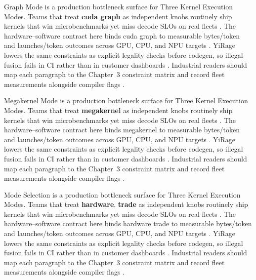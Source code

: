Graph Mode is a production bottleneck surface for Three Kernel Execution Modes. Teams that treat \textbf{cuda graph} as independent knobs routinely ship kernels that win microbenchmarks yet miss decode SLOs on real fleets \citep{kwon2023vllm,patel2025llminference}. The hardware--software contract here binds cuda graph to measurable bytes/token and launches/token outcomes across GPU, CPU, and NPU targets \citep{nvidia2024cudagraphs,taxbreak2026}. YiRage lowers the same constraints as explicit legality checks before codegen, so illegal fusion fails in CI rather than in customer dashboards \citep{liu2024deepseekv3,memoryfloor2026}. Industrial readers should map each paragraph to the Chapter~3 constraint matrix and record fleet measurements alongside compiler flags \citep{patel2025llminference,nvidia2022hopper}.

Megakernel Mode is a production bottleneck surface for Three Kernel Execution Modes. Teams that treat \textbf{megakernel} as independent knobs routinely ship kernels that win microbenchmarks yet miss decode SLOs on real fleets \citep{nvidia2024cudagraphs,taxbreak2026}. The hardware--software contract here binds megakernel to measurable bytes/token and launches/token outcomes across GPU, CPU, and NPU targets \citep{liu2024deepseekv3,memoryfloor2026}. YiRage lowers the same constraints as explicit legality checks before codegen, so illegal fusion fails in CI rather than in customer dashboards \citep{patel2025llminference,nvidia2022hopper}. Industrial readers should map each paragraph to the Chapter~3 constraint matrix and record fleet measurements alongside compiler flags \citep{taxbreak2026,semianalysis2024tma}.

Mode Selection is a production bottleneck surface for Three Kernel Execution Modes. Teams that treat \textbf{hardware}, \textbf{trade} as independent knobs routinely ship kernels that win microbenchmarks yet miss decode SLOs on real fleets \citep{liu2024deepseekv3,memoryfloor2026}. The hardware--software contract here binds hardware trade to measurable bytes/token and launches/token outcomes across GPU, CPU, and NPU targets \citep{patel2025llminference,nvidia2022hopper}. YiRage lowers the same constraints as explicit legality checks before codegen, so illegal fusion fails in CI rather than in customer dashboards \citep{taxbreak2026,semianalysis2024tma}. Industrial readers should map each paragraph to the Chapter~3 constraint matrix and record fleet measurements alongside compiler flags \citep{memoryfloor2026,amd2024xdna}.


